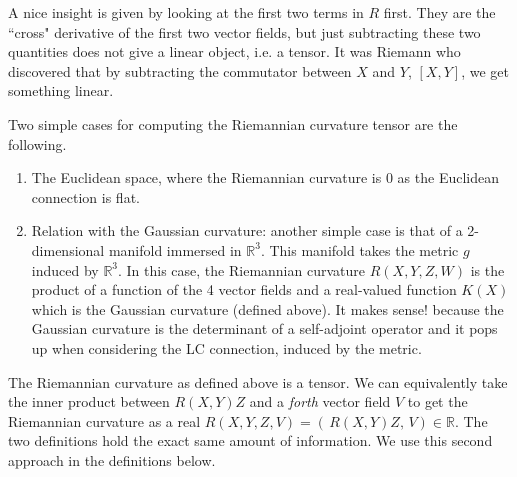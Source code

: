 \documentclass[a4paper,12pt,reqno]{amsbook}
\theoremstyle{definition} %
\newcommand{\1}{\mathbbm{1}}
\newcommand{\R}{\ensuremath{\mathbb{R}}}
\theoremstyle{plain}
\theoremstyle{remark}
\begin{document}



\begin{remark}
    A nice insight is given by looking at the first two terms in $R$ first. They are the ``cross" derivative of the first two vector fields, but just subtracting these two quantities does not give a linear object, i.e. a tensor. It was Riemann who discovered that by subtracting the commutator between $X$ and $Y$, $[X,Y]$, we get something linear.
\end{remark}

\begin{example}
    Two simple cases for computing the Riemannian curvature tensor are the following. 
    \begin{enumerate}
        \item The Euclidean space, where the Riemannian curvature is 0 as the Euclidean connection is flat.
        \item Relation with the Gaussian curvature: another simple case is that of a 2-dimensional manifold immersed in $\R^3$. This manifold takes the metric $g$ induced by $\R^3$. In this case, the Riemannian curvature $R(X,Y,Z,W)$ is the product of a function of the 4 vector fields and a real-valued function $K(X)$ which is the Gaussian curvature (defined above). It makes sense! because the Gaussian curvature is the determinant of a self-adjoint operator and it pops up when considering the LC connection, induced by the metric. 
    \end{enumerate}
\end{example}

\begin{remark}
The Riemannian curvature as defined above is a tensor. We can equivalently take the inner product between $R(X,Y)Z$ and a \textit{forth} vector field $V$ to get the Riemannian curvature as a real $R(X,Y,Z,V) = (\,R(X,Y)Z,\,V) \in \R$. The two definitions hold the exact same amount of information. We use this second approach in the definitions below. 
\end{remark}
\end{document}
